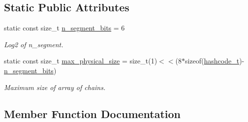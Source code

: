 \subsection*{Static Public Attributes}
\begin{DoxyCompactItemize}
\item 
\hypertarget{structtbb_1_1internal_1_1hash__map__segment__base_a064a7838acc52c634186568e671b21fb}{}static const size\+\_\+t \hyperlink{structtbb_1_1internal_1_1hash__map__segment__base_a064a7838acc52c634186568e671b21fb}{n\+\_\+segment\+\_\+bits} = 6\label{structtbb_1_1internal_1_1hash__map__segment__base_a064a7838acc52c634186568e671b21fb}

\begin{DoxyCompactList}\small\item\em Log2 of n\+\_\+segment. \end{DoxyCompactList}\item 
\hypertarget{structtbb_1_1internal_1_1hash__map__segment__base_ac9eae8f9dd6b4c573283125a72b8cf53}{}static const size\+\_\+t \hyperlink{structtbb_1_1internal_1_1hash__map__segment__base_ac9eae8f9dd6b4c573283125a72b8cf53}{max\+\_\+physical\+\_\+size} = size\+\_\+t(1)$<$$<$(8$\ast$sizeof(\hyperlink{structtbb_1_1internal_1_1hash__map__segment__base_aab5635d0ca44cada2bea263ae1455134}{hashcode\+\_\+t})-\/\hyperlink{structtbb_1_1internal_1_1hash__map__segment__base_a064a7838acc52c634186568e671b21fb}{n\+\_\+segment\+\_\+bits})\label{structtbb_1_1internal_1_1hash__map__segment__base_ac9eae8f9dd6b4c573283125a72b8cf53}

\begin{DoxyCompactList}\small\item\em Maximum size of array of chains. \end{DoxyCompactList}\end{DoxyCompactItemize}


\subsection{Member Function Documentation}
\hypertarget{structtbb_1_1internal_1_1hash__map__segment__base_aec229c429c7015e08a30e714eb1a6d21}{}
